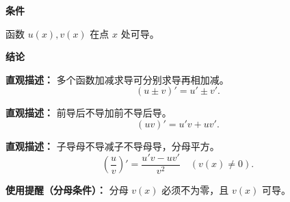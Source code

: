 \begin{statementbox}

	\textbf{\textcolor{CStatement}{条件}}
	\begin{description}[style=nextline, leftmargin=2.8em, labelsep=0.5em, itemsep=0.35em]
		\item[\textbf{\textcolor{CStatement}{条件1（可导条件）：}}] 函数 $u(x), v(x)$ 在点 $x$ 处可导。
	\end{description}

	\textbf{\textcolor{CStatement}{结论}}
	\begin{description}[style=nextline, leftmargin=2.8em, labelsep=0.5em, itemsep=0.45em]
		\item[\textbf{\textcolor{CStatement}{结论一（和差求导）：}}]
			\textbf{\textcolor{CStatement}{直观描述：}}
			多个函数加减求导可分别求导再相加减。
			\[
				(u\pm v)' = u' \pm v'.
			\]

		\item[\textbf{\textcolor{CStatement}{结论二（乘积求导）：}}]
			\textbf{\textcolor{CStatement}{直观描述：}}
			前导后不导加前不导后导。
			\[
				(uv)' = u'v + uv'.
			\]

		\item[\textbf{\textcolor{CStatement}{推广结论（商求导）：}}]
			\textbf{\textcolor{CStatement}{直观描述：}}
			子导母不导减子不导母导，分母平方。
			\[
				\left(\frac{u}{v}\right)' = \frac{u'v - uv'}{v^2} \quad (v(x) \neq 0).
			\]
	\end{description}

	\medskip
	\textbf{\textcolor{CStatement}{使用提醒（分母条件）：}}
	分母 $v(x)$ 必须不为零，且 $v(x)$ 可导。
\end{statementbox}
